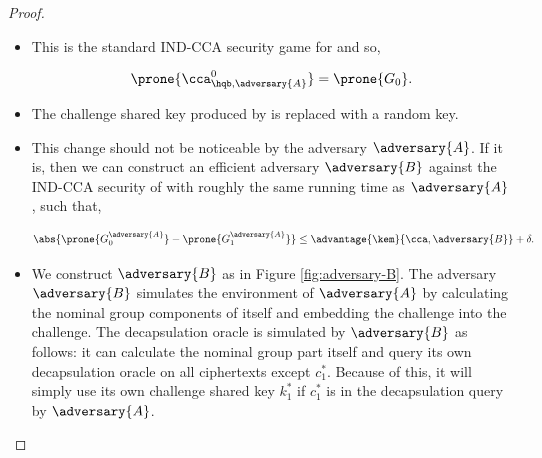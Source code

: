 \begin{proof}
                    \begin{itemize}
                    \item[\textbf{Game 0}]
                        This is the standard IND-CCA security game for \hqb and so,

                        \[ \prone{\cca^0_{\hqb, \adversary{A}}} = \prone{G_0}. \]

                    \end{itemize}

                    \begin{itemize}
                    \item[\textbf{Game 1}]
                        The challenge shared key produced by \kem is replaced with a random key.
                    \item[\emph{Claim 1}]
                        This change should not be noticeable by the adversary $\adversary{A}$.
                        If it is, then we can construct an efficient adversary $\adversary{B}$ against the IND-CCA security of \kem with roughly the same running time as $\adversary{A}$, such that,

                        \[
                            \abs{\prone{G^{\adversary{A}}_0} - \prone{G^{\adversary{A}}_1}} \leq \advantage{\kem}{\cca, \adversary{B}} + \delta.
                        \]

                    \item[\emph{Proof}]
                        We construct $\adversary{B}$ as in Figure \ref{fig:adversary-B}.
                        The adversary $\adversary{B}$ simulates the environment of $\adversary{A}$ by calculating the nominal group components of \hqb itself and embedding the \kem challenge into the \hqb challenge.
                        The decapsulation oracle is simulated by $\adversary{B}$ as follows: it can calculate the nominal group part itself and query its own \kem decapsulation oracle on all ciphertexts except $c_1^*$.
                        Because of this, it will simply use its own challenge shared key $k^*_1$ if $c^*_1$ is in the decapsulation query by $\adversary{A}$.


\end{itemize}
\end{proof}
